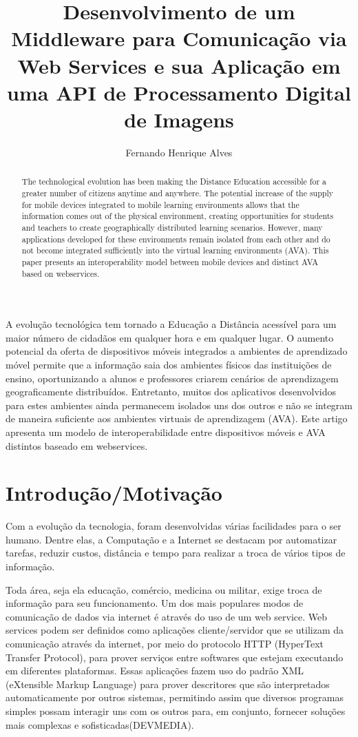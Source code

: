 \documentclass[12pt]{article}
\title{Desenvolvimento de um Middleware para Comunicação via Web Services e sua Aplicação  em uma API de Processamento Digital de Imagens}
\author{Fernando Henrique Alves\inst{1}}
\begin{document}
 

\maketitle

\begin{abstract}
  The technological evolution has been making the Distance
  Education accessible for a greater number of citizens anytime and anywhere.
  The potential increase of the supply for mobile devices integrated to mobile
  learning environments allows that the information comes out of the physical
  environment, creating opportunities for students and teachers to create
  geographically distributed learning scenarios. However, many applications
  developed for these environments remain isolated from each other and do not
  become integrated sufficiently into the virtual learning environments (AVA).
  This paper presents an interoperability model between mobile devices and
  distinct AVA based on webservices.
\end{abstract}

\begin{resumo} 
  A evolução tecnológica tem tornado a Educação a Distância
  acessível para um maior número de cidadãos em qualquer hora e em qualquer
  lugar. O aumento potencial da oferta de dispositivos móveis integrados a
  ambientes de aprendizado móvel permite que a informação saia dos ambientes
  físicos das instituições de ensino, oportunizando a alunos e professores
  criarem cenários de aprendizagem geograficamente distribuídos. Entretanto,
  muitos dos aplicativos desenvolvidos para estes ambientes ainda permanecem
  isolados uns dos outros e não se integram de maneira suficiente aos ambientes
  virtuais de aprendizagem (AVA). Este artigo apresenta um modelo de
  interoperabilidade entre dispositivos móveis e AVA distintos baseado em
  webservices.
\end{resumo}


\section{Introdução/Motivação}

Com a evolução da tecnologia, foram desenvolvidas várias facilidades para o ser humano. 
Dentre elas, a Computação e a Internet se destacam por automatizar tarefas, reduzir
custos, distância e tempo para realizar a troca de vários tipos de informação. 

Toda área, seja ela educação, comércio, medicina ou militar, exige troca de informação para seu funcionamento. 
Um dos mais populares modos de comunicação de dados via internet é através do uso de um web service. 
Web services podem ser definidos como aplicações cliente/servidor que se utilizam da comunicação 
através da internet, por meio do protocolo HTTP (HyperText Transfer Protocol), para prover serviços 
entre softwares que estejam executando em diferentes plataformas. Essas aplicações fazem uso do padrão 
XML (eXtensible Markup Language) para prover descritores que são interpretados automaticamente 
por outros sistemas, permitindo assim que diversos programas simples possam interagir uns com os 
outros para, em conjunto, fornecer soluções mais complexas e sofisticadas(DEVMEDIA).
\end{document}
